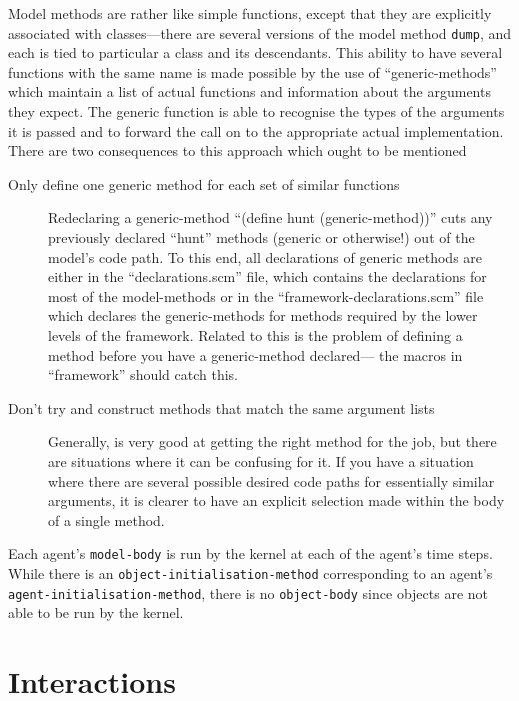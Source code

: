 Model methods are rather like simple functions, except that they are
explicitly associated with classes---there are several versions of
the model method \texttt{dump}, and each is tied to particular a class
and its descendants.  This ability to have several functions with the same
name is made possible by the use of ``generic-methods'' which
maintain a list of actual functions and information about the
arguments they expect.  The generic function is able to 
recognise the types of the arguments it is passed and to forward the
call on to the appropriate actual implementation.  There are two
consequences to this approach which ought to be mentioned
\begin{description}
  \item[Only define one generic method for each set of similar
    functions] Redeclaring a generic-method ``(define hunt
    (generic-method))'' cuts any previously declared ``hunt'' methods
    (generic or otherwise!) out of the model's code path. To this end,
    all declarations of generic methods are either in the
    ``declarations.scm'' file, which contains the declarations for
    most of the model-methods or in the ``framework-declarations.scm''
    file which declares the generic-methods for methods required by
    the lower levels of the framework.  Related to this is the problem
    of defining a method before you have a generic-method declared---
    the macros in ``framework'' should catch this.
  \item[Don't try and construct methods that match the same argument
    lists] Generally, \SCLOS is very good at getting the right
    method for the job, but there are situations where it can be
    confusing for it.  If you have a situation where there are several
    possible desired code paths for essentially similar arguments, it
    is clearer to have an explicit selection made within the body of a
    single method.
\end{description}
 
Each agent's \texttt{model-body} is run by the kernel at each of the
agent's time steps. While there is an
\texttt{object-initialisation-method} corresponding to an agent's
\texttt{agent-initialisation-method}, there is no \texttt{object-body}
since objects are not able to be run by the kernel.

\section{Interactions}\label{interactions}

